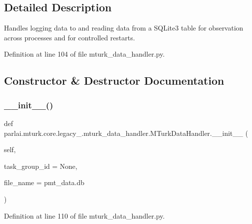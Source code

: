 \subsection{Detailed Description}
\begin{DoxyVerb}Handles logging data to and reading data from a SQLite3 table for observation across
processes and for controlled restarts.
\end{DoxyVerb}
 

Definition at line 104 of file mturk\+\_\+data\+\_\+handler.\+py.



\subsection{Constructor \& Destructor Documentation}
\mbox{\label{classparlai_1_1mturk_1_1core_1_1legacy__2018_1_1mturk__data__handler_1_1MTurkDataHandler_a29c63ed977f51176d78bffe42f5d21fe}} 
\subsubsection{\texorpdfstring{\+\_\+\+\_\+init\+\_\+\+\_\+()}{\_\_init\_\_()}}
{\footnotesize\ttfamily def parlai.\+mturk.\+core.\+legacy\+\_.\+mturk\+\_\+data\+\_\+handler.\+M\+Turk\+Data\+Handler.\+\_\+\+\_\+init\+\_\+\+\_\+ (\begin{DoxyParamCaption}\item[{}]{self,  }\item[{}]{task\+\_\+group\+\_\+id = {\ttfamily None},  }\item[{}]{file\+\_\+name = {\ttfamily \textquotesingle{}pmt\+\_\+data.db\textquotesingle{}} }\end{DoxyParamCaption})}



Definition at line 110 of file mturk\+\_\+data\+\_\+handler.\+py.



